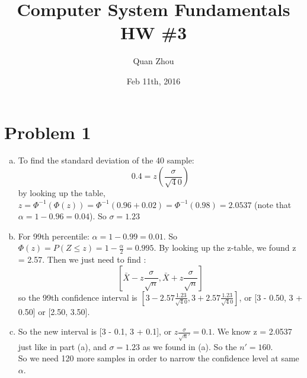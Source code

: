 \documentclass{article}   	                         %
\title{Computer System Fundamentals HW \#3}
\author{Quan Zhou}
\date{Feb 11th, 2016}
\begin{document}
\maketitle
\section*{Problem 1}
\begin{enumerate}[(a)]
\item
To find the standard deviation of the 40 sample:\\
\begin{equation}0.4 = z\left(\frac{\sigma}{\sqrt40}\right)\end{equation}
by looking up the table, $z = \Phi^{-1}(\Phi(z)) = \Phi^{-1}(0.96+0.02) = \Phi^{-1}(0.98) = 2.0537$
(note that $\alpha = 1 - 0.96 = 0.04$). So $\sigma = 1.23$
\item
For 99th percentile: $\alpha = 1- 0.99 = 0.01$. So $\Phi(z) = P(Z\leq z) = 1 - \frac{\alpha}{2} = 0.995$. By looking up the z-table, we found z = 2.57. Then we just need to find :\\
\begin{equation} \left[\bar X - z\frac{\sigma}{\sqrt n}, \bar X + z\frac{\sigma}{\sqrt n}\right]\end{equation}
so the 99th confidence interval is $\left[3 - 2.57\frac{1.23}{\sqrt 40}, 3 + 2.57\frac{1.23}{\sqrt 40}\right]$, or [3 - 0.50, 3 + 0.50] or [2.50, 3.50].
\item
So the new interval is [3 - 0.1, 3 + 0.1], or $z\frac{\sigma}{\sqrt n\prime} = 0.1$. We know z = 2.0537 just like in part (a), and $\sigma = 1.23$ as we found in (a). So the $n\prime = 160$. \\
So we need 120 more samples in order to narrow the confidence level at same $\alpha$.

\end{enumerate}
\end{document}
